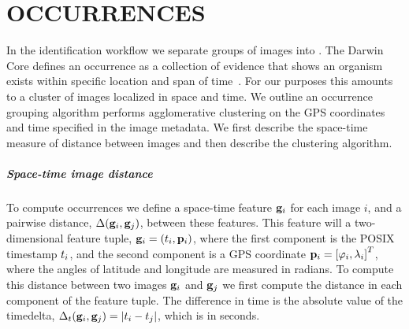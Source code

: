 \begin{comment}
fixtex --fpaths appendix.tex --outline --asmarkdown --numlines=999 --shortcite -w && ./checklang.py outline_appendix.md
\end{comment}

\appendix    %

\chapter{OCCURRENCES}\label{app:occurgroup}

    In the identification workflow we separate groups of images into .
    The Darwin Core defines an occurrence as a collection of evidence that shows an organism exists within
      specific location and span of time~\cite{wieczorek_darwin_2012}.
    For our purposes this amounts to a cluster of images localized in space and time.
    We outline an occurrence grouping algorithm performs agglomerative clustering on the GPS coordinates and time
      specified in the image metadata.
    We first describe the space-time measure of distance between images and then describe the clustering
      algorithm.

    \paragraph{Space-time image distance}
    To compute occurrences we define a space-time feature $\mathbf{g}_i$ for each image $i$, and a pairwise distance,
      $\Delta(\mathbf{g}_i, \mathbf{g}_j)$, between these features.
    This feature will a two-dimensional feature tuple, %
    $\mathbf{g}_i = \left(t_i, \mathbf{p}_i\right)$, where the first component is the POSIX timestamp $t_i$, and the second
      component is a GPS coordinate %
    $\mathbf{p}_i = \left[\varphi_i, \lambda_i\right]^{T}$, where the angles of latitude and longitude are measured in radians.
    To compute this distance between two images $\mathbf{g}_i$ and $\mathbf{g}_j$ we first compute the distance in each component
      of the feature tuple.
    The difference in time is the absolute value of the timedelta,  %
    $\Delta_t(\mathbf{g}_i, \mathbf{g}_j) = |t_i - t_j|$, which is in seconds.

